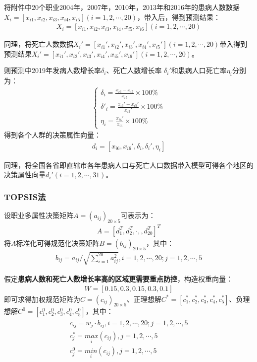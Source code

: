 \documentclass{whutmod}
\begin{document}
	     
	     
	  将附件中$20$个职业2004年，2007年，2010年，2013年和2016年的患病人数数据$X_{i}=[x_{i1},x_{i2},x_{i3},x_{i4},x_{i5}](i=1,2,\cdots,20)$，带入后，得到预测结果：
     \begin{gather*}
      X_{i}=[x_{i1},x_{i2},x_{i3},x_{i4},x_{i5},x_{i6}](i=1,2,\cdots,20)
     \end{gather*}
     
     同理，将死亡人数数据$X_{i}'=[x_{i1}',x_{i2}',x_{i3}',x_{i4}',x_{i5}'](i=1,2,\cdots,20)$带入得到预测结果$X_{i}'=[x_{i1}',x_{i2}',x_{i3}',x_{i4}',x_{i5}',x_{i6}'](i=1,2,\cdots,20)$。


     则预测中2019年发病人数增长率$ \delta_{i}$、死亡人数增长率 $ \delta _{i}'$和患病人口死亡率$\eta_{i}$分别为：
      \begin{gather}
      \left\{\begin{matrix}
      \delta _{i}=\frac{x_{i6}-x_{i5}}{x_{i5}} \times 100\%\\ 
      \delta '_{i} =\frac{x_{i6}'-x_{i5}'}{x_{i5}'} \times 100\%\\ 
      \eta_{i} =\frac{x_{i6}'}{x_{i6}} \times 100\%
      \end{matrix}\right.
      \end{gather}
      得到各个人群的决策属性向量：
      \begin{gather*}
      d_{i}=[x_{i6},x_{i6}', \delta_{i} , \delta _{i}',\eta_{i} ]
      \end{gather*}
      
      同理，将全国各省即直辖市各年患病人口与死亡人口数据带入模型可得各个地区的决策属性向量$d_{i}'(i=1,2,\cdots,31)$。
    \subsubsection{TOPSIS法}
    设职业多属性决策矩阵$A=(a_{ij})_{20 \times 5}$可表示为：
     \begin{gather*}
  A= [d_{1}^{T},d_{2}^{T},\cdot,,d_{20}^{T}]^{T}
    \end{gather*}
    将$A$标准化可得规范化决策矩阵$B=(b_{ij})_{20 \times 5}$，其中：
     \begin{gather*}
   b_{ij}=a_{ij}/\sqrt{\sum_{i=1}^{20}a_{ij}^{2}},i=1,2,\cdots,20;j=1,2,\cdots,5
    \end{gather*}
    
    假定\textbf{患病人数和死亡人数增长率高的区域更需要重点防控}，构造权重向量：
     \begin{gather}
     W=[0.15,0.3,0.15,0.3,0.1]
    \end{gather}
    即可求得加权规范矩阵为$C=(c_{ij})_{20 \times 5}$、正理想解$C^{*}=[c_{1}^{*},c_{2}^{*},c_{3}^{*},c_{4}^{*},c_{5}^{*}]$、负理想解$C^{0}=[c_{1}^{0},c_{2}^{0},c_{3}^{0},c_{4}^{0},c_{5}^{0}]$，其中：
     \begin{gather*}
     \begin{matrix}
     c_{ij}=w_{j} \cdot b_{ij} ,i=1,2,\cdots,20;j=1,2,\cdots,5\\
c_{j}^{*}=\underset{i}{max}(c_{ij}) ,j=1,2,\cdots,5\\
c_{j}^{0}=\underset{i}{min}(c_{ij}) ,j=1,2,\cdots,5
     \end{matrix}
    \end{gather*}
    
\end{document}
